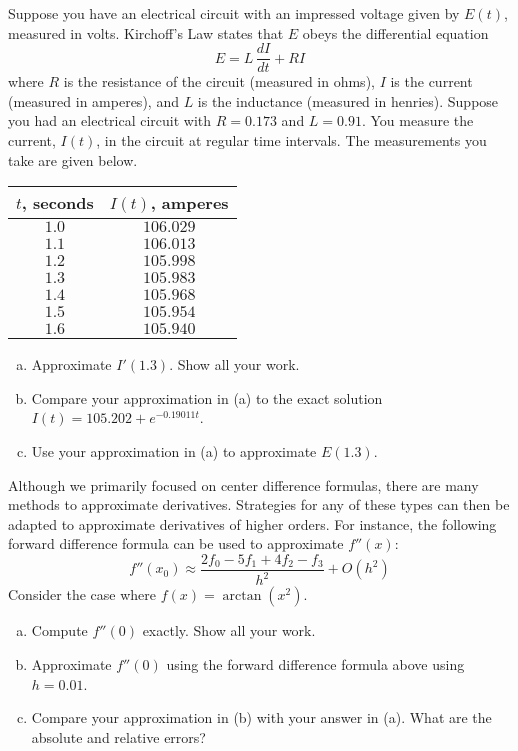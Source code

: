 \documentclass[11pt,letterpaper]{article}
\begin{document}
\newpage



 Suppose you have an electrical circuit with an impressed voltage given by $E(t)$, measured in volts. Kirchoff's Law states that $E$ obeys the differential equation 
	\[
	E= L\, \dfrac{dI}{dt} + RI
	\]
where $R$ is the resistance of the circuit (measured in ohms), $I$ is the current (measured in amperes), and $L$ is the inductance (measured in henries). Suppose you had an electrical circuit with $R= 0.173$ and $L= 0.91$. You measure the current, $I(t)$, in the circuit at regular time intervals. The measurements you take are given below. 
	\begin{table}[!ht]
	\centering
	\begin{tabular}{cc}
	$t$, seconds & $I(t)$, amperes \\ \hline
	$1.0$ & $106.029$ \\
	$1.1$ & $106.013$ \\
	$1.2$ & $105.998$ \\
	$1.3$ & $105.983$ \\
	$1.4$ & $105.968$ \\
	$1.5$ & $105.954$ \\
	$1.6$ & $105.940$
	\end{tabular}
	\end{table}

\begin{enumerate}[(a)]
\item Approximate $I'(1.3)$. Show all your work.
\item Compare your approximation in (a) to the exact solution $I(t)= 105.202 + e^{-0.19011t}$. 
\item Use your approximation in (a) to approximate $E(1.3)$. 
\end{enumerate}



\newpage



 Although we primarily focused on center difference formulas, there are many methods to approximate derivatives. Strategies for any of these types can then be adapted to approximate derivatives of higher orders. For instance, the following forward difference formula can be used to approximate $f''(x)$:
	\[
	f''(x_0) \approx \dfrac{2f_0 - 5f_1 + 4f_2 - f_3}{h^2} + O(h^2)
	\]
Consider the case where $f(x)= \arctan(x^2)$. 
	\begin{enumerate}[(a)]
	\item Compute $f''(0)$ exactly. Show all your work.
	\item Approximate $f''(0)$ using the forward difference formula above using $h= 0.01$. 
	\item Compare your approximation in (b) with your answer in (a). What are the absolute and relative errors? 
	\end{enumerate}
\end{document}
